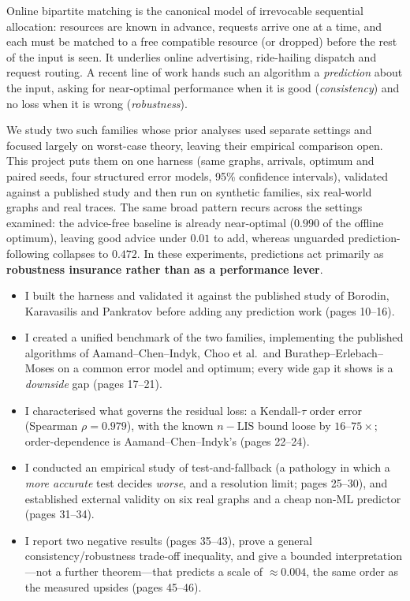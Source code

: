 Online bipartite matching is the canonical model of irrevocable
sequential allocation: resources are known in advance, requests arrive
one at a time, and each must be matched to a free compatible resource
(or dropped) before the rest of the input is seen. It underlies online
advertising, ride-hailing dispatch and request routing. A recent line of
work hands such an algorithm a \emph{prediction} about the input, asking
for near-optimal performance when it is good (\emph{consistency}) and no
loss when it is wrong (\emph{robustness}).

We study two such families whose prior analyses used separate settings
and focused largely on worst-case theory, leaving their empirical
comparison open. This project puts them on one harness (same graphs,
arrivals, optimum and paired seeds, four structured error models, 95\%
confidence intervals), validated against a published study and then run
on synthetic families, six real-world graphs and real traces. The same
broad pattern recurs across the settings examined: the advice-free
baseline is already near-optimal (\(0.990\) of the offline optimum),
leaving good advice under \(0.01\) to add, whereas unguarded
prediction-following collapses to \(0.472\). In these experiments,
predictions act primarily as \textbf{robustness insurance rather than as
a performance lever}.

\begin{itemize}
\tightlist
\item
  I built the harness and validated it against the published study of
  Borodin, Karavasilis and Pankratov before adding any prediction work
  (pages 10--16).
\item
  I created a unified benchmark of the two families, implementing the
  published algorithms of Aamand--Chen--Indyk, Choo et al.~and
  Burathep--Erlebach--Moses on a common error model and optimum; every
  wide gap it shows is a \emph{downside} gap (pages 17--21).
\item
  I characterised what governs the residual loss: a Kendall-\(\tau\)
  order error (Spearman \(\rho=0.979\)), with the known
  \(n-\mathrm{LIS}\) bound loose by \(16\)--\(75\times\);
  order-dependence is Aamand--Chen--Indyk's (pages 22--24).
\item
  I conducted an empirical study of test-and-fallback (a pathology in
  which a \emph{more accurate} test decides \emph{worse}, and a
  resolution limit; pages 25--30), and established external validity on
  six real graphs and a cheap non-ML predictor (pages 31--34).
\item
  I report two negative results (pages 35--43), prove a general
  consistency/robustness trade-off inequality, and give a bounded
  interpretation---not a further theorem---that predicts a scale of
  \(\approx0.004\), the same order as the measured upsides (pages
  45--46).
\end{itemize}
